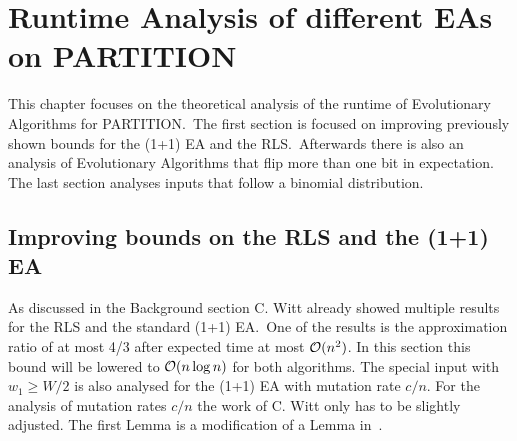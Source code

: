 \chapter{Runtime Analysis of different EAs on PARTITION}\label{ch:Content1}

This chapter focuses on the theoretical analysis of the runtime of Evolutionary Algorithms for PARTITION.\ 
The first section is focused on improving previously shown bounds for the (1+1) EA and the RLS.\ 
Afterwards there is also an analysis of Evolutionary Algorithms that flip more than one bit in expectation.
The last section analyses inputs that follow a binomial distribution.

\section{Improving bounds on the RLS and the (1+1) EA}
As discussed in the Background section C. Witt already showed multiple results for the RLS and the standard (1+1) EA.\ 
One of the results is the approximation ratio of at most 4/3 after expected time at most $\mathcal{O}(n^2)$.
In this section this bound will be lowered to $\mathcal{O}(n\log{n})$ for both algorithms.
The special input with $w_1\ge W/2$ is also analysed for the (1+1) EA with mutation rate $c/n$.
For the analysis of mutation rates $c/n$ the work of C. Witt only has to be slightly adjusted.
The first Lemma is a modification of a Lemma in~\cite{witt2005worst}.

